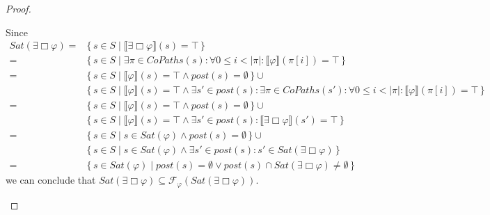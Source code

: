 \documentclass[12pt]{article}
\newcommand{\always}{\Box}
\theoremstyle{definition}
\newcommand{\satisfaction}[1]{\llbracket #1 \rrbracket}
\newenvironment{franck}{\color{red}}{\color{black}}
\begin{document}
\begin{proof}
\begin{itemize}
\begin{franck}
\begin{itemize}
Since
\begin{align*}
\mathit{Sat}(\exists \always \varphi)
= & \{\, s \in S \mid \satisfaction{\exists \always \varphi}(s) = \top \,\}\\
= & \{\, s \in S \mid \exists \pi \in \mathit{CoPaths}(s) : \forall 0 \leq i < |\pi| : \satisfaction{\varphi}(\pi[i]) = \top \,\}\\
= & \{\, s \in S \mid \satisfaction{\varphi}(s) = \top \wedge \mathit{post}(s) = \emptyset \,\} \cup\\
& \{\, s \in S \mid \satisfaction{\varphi}(s) = \top \wedge \exists s' \in \mathit{post}(s) : \exists \pi \in \mathit{CoPaths}(s') : \forall 0 \leq i < |\pi| : \satisfaction{\varphi}(\pi[i]) = \top \,\}\\
= & \{\, s \in S \mid \satisfaction{\varphi}(s) = \top \wedge \mathit{post}(s) = \emptyset \,\} \cup\\
& \{\, s \in S \mid \satisfaction{\varphi}(s) = \top \wedge \exists s' \in \mathit{post}(s) : \satisfaction{\exists \always \varphi}(s') = \top \,\}\\
= & \{\, s \in S \mid s \in \mathit{Sat}(\varphi) \wedge \mathit{post}(s) = \emptyset \,\} \cup\\
& \{\, s \in S \mid s \in \mathit{Sat}(\varphi) \wedge \exists s' \in \mathit{post}(s) : s' \in \mathit{Sat}(\exists \always \varphi) \,\}\\
= & \{\, s \in \mathit{Sat}(\varphi) \mid \mathit{post}(s) = \emptyset \vee \mathit{post}(s) \cap \mathit{Sat}(\exists \always \varphi) \not= \emptyset \,\}
\end{align*}
we can conclude that $\mathit{Sat}(\exists \always \varphi) \subseteq \mathcal{F}_{\varphi}(\mathit{Sat}(\exists \always \varphi))$.


\end{itemize}
\end{franck}
\end{itemize}
\end{proof}
\end{document}
